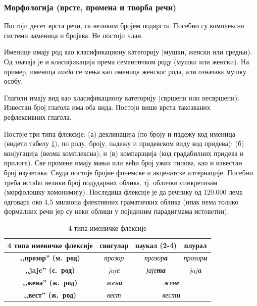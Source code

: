 \begin{multicols}{2}
\subsubsection {Морфологија (врсте, промена и творба речи)}
  
Постоји десет врста речи, са великим бројем подврста. Посебно су комплексни системи заменица и бројева. Не постоји члан. 

Именице имају род као класификациону категорију (мушки, женски или средњи). Од значаја је и класификација према семантичком роду (мушки или женски). На пример, именица \textit{газда} се мења као именица женског рода, али означава мушку особу. 

Глаголи имају вид као класификациону категорију (свршени или  несвршени). Известан број глагола има оба вида. Постоји више врста такозваних рефлексивних глагола. 

Постоје три типа флексије: (а) деклинација (по броју и падежу код именица (видети табелу \ref{imenicke_fleksije}), по роду, броју, падежу и придевском виду код придева); (б) конјугација (веома комплексна); и (в) компарација (код градабилних придева и прилога).  Све промене имају мањи или већи број ужих типова, као и известан број изузетака. Свуда постоје бројне фонемске и акценатске алтернације. Посебно треба истаћи велики број подударних облика, тј. облички синкретизам (морфолошку хомонимију). Последица флексије је да речнику од 120.000 лема одговара око 4,5 милиона флективних граматичких облика (ипак нема толико формалних речи јер су неки облици у појединим парадигмама истоветни). 

\begin{table}[ht]
\begin{center}
\begin{tabular}{|c|c|c|c|}
\hline
{\textbf{4 типа именичке флексије}} & {\textbf{сингулар}} & {\textbf{паукал (2-4)}} & {\textbf{плурал}} \\
\hline
{\textbf{,,прозор'' (м.~род)}} & \textit{прозор} & \textit{прозор\textbf{а}} & \textit{прозор\textbf{и}} \\
\hline
{\textbf{,,jaje'' (с.~род)}} & \textit{jaj\textbf{e}} & \textit{јаје\textbf{та}} & \textit{jaj\textbf{a}} \\
\hline
{\textbf{,,жена'' (ж.~род)}} & \textit{жен\textbf{а}} & \multicolumn{2}{c|}{\textit{жен\textbf{е}}} \\
\hline
{\textbf{,,вест'' (ж.~род)}} & \textit{вест} &  \multicolumn{2}{c|}{\textit{вест\textbf{и}}} \\
\hline
\end{tabular}
\end{center}
\caption{4 типа именичке флексије}
\label{imenicke_fleksije}
\end{table}



\end{multicols}
